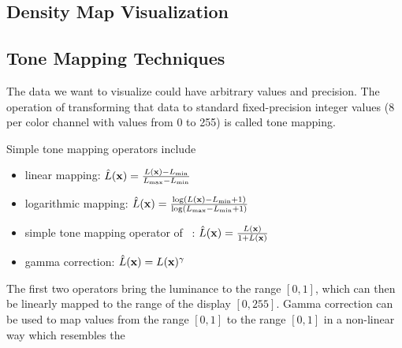 
\subsection{Density Map Visualization}
\label{sec:density-map}

\subsection{Tone Mapping Techniques}
\label{sec:tone-mapping}

The data we want to visualize could have arbitrary values and precision.
The operation of transforming that data to standard fixed-precision integer values (\SI{8}{\bit} per color channel with values from 0 to 255) is called tone mapping.

Simple tone mapping operators include
\begin{itemize}
	\item linear mapping: $\tonemappedluminance (\vector{x}) = \frac{\luminance (\vector{x}) - \luminance_\text{min}}{\luminance_\text{max} - \luminance_\text{min}}$
	
	\item logarithmic mapping: $\tonemappedluminance (\vector{x}) = \frac{\log (\luminance (\vector{x}) - \luminance_\text{min} + 1)}{\log (\luminance_\text{max} - \luminance_\text{min} + 1)}$
	
	\item simple tone mapping operator of \citeauthor{Reinhard2002}~\cite{Reinhard2002}: $\tonemappedluminance (\vector{x}) = \frac{\luminance (\vector{x})}{1 + \luminance(\vector{x})}$
	
	\item gamma correction: $\tonemappedluminance (\vector{x}) = \luminance (\vector{x}) ^ \gamma$

\end{itemize}
The first two operators bring the luminance to the range $[0, 1]$, which can then be linearly mapped to the range of the display $[0, 255]$.
Gamma correction can be used to map values from the range $[0, 1]$ to the range $[0, 1]$ in a non-linear way which resembles the %

